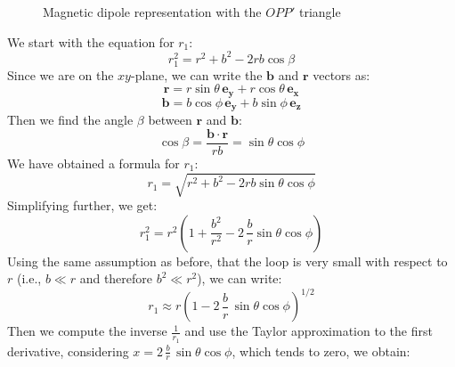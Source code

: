 \begin{figure}
    \centering
    \caption{Magnetic dipole representation with the $OPP'$ triangle}
    \label{fig:dipole2}
\end{figure}

We start with the equation for \( r_1 \):
$$
    r_1^2 = r^2 + b^2 - 2 r b \cos\beta
$$
Since we are on the \( xy \)-plane, we can write the 
\( \mathbf{b} \) and \( \mathbf{r} \) vectors as:
$$
    \mathbf{r} = r \sin \theta \, \mathbf{e_y} 
    + r \cos \theta \, \mathbf{e_x}
$$
$$
    \mathbf{b} = b \cos \phi \, \mathbf{e_y} 
    + b \sin \phi \, \mathbf{e_z}
$$
Then we find the angle \(\beta\) between 
\( \mathbf{r} \) and \( \mathbf{b} \):
$$
    \cos \beta = \frac{\mathbf{b} \cdot \mathbf{r}}{r b} 
    = \sin \theta \cos \phi
$$
We have obtained a formula for \( r_1 \):
$$
    r_1 = \sqrt{r^2 + b^2 - 2 r b \sin \theta \cos \phi}
$$
Simplifying further, we get:
$$
    r_1^2 = r^2 \left( 1 + \frac{b^2}{r^2} - 2\, 
    \frac{b}{r} \sin \theta \cos \phi \right)
$$
Using the same assumption as before, that the loop is 
very small with respect to \( r \) (i.e., \( b \ll r \) 
and therefore \( b^2 \ll r^2 \)), we can write:
$$
    r_1 \approx r \left( 1 - 2 \, \frac{b}{r} \, 
    \sin \theta \cos \phi \right)^{1/2}
$$
Then we compute the inverse \( \frac{1}{r_1} \) and 
use the Taylor approximation to the first derivative, 
considering \( x = 2 \, \frac{b }{r} \, \sin \theta 
\cos \phi \), which tends to zero, we obtain:

